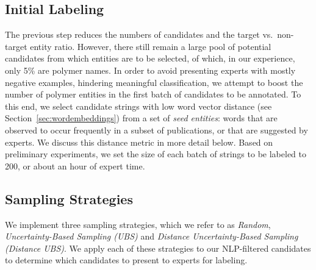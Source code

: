 \subsection{Initial Labeling}
The previous step %
reduces the numbers of candidates and the target vs.\ non-target entity ratio.
However, there still remain a large pool of potential candidates from which entities are to be selected,
of which, in our experience, only 5\% are polymer names.
In order to avoid presenting experts with mostly negative examples, hindering meaningful classification,
we attempt to boost the number of polymer entities in the first batch of candidates to be annotated.
To this end, we select candidate strings with low word vector distance (see Section~\ref{sec:wordembeddings}) from
a set of \emph{seed entities}:
words that are observed to occur frequently  
in a subset of publications, or that are suggested by experts.
We discuss this distance metric in more detail below.
Based on preliminary experiments, we set the size of each batch of strings to be labeled to 200, 
or about an hour of expert time.

\subsection{Sampling Strategies}\label{sec:sampling}
We implement three sampling strategies, which we refer to as \textit{Random}, \textit{Uncertainty-Based Sampling (UBS)} and \textit{Distance Uncertainty-Based Sampling (Distance UBS)}.
We apply each of these strategies to our NLP-filtered candidates to determine which candidates to present to experts for labeling.

